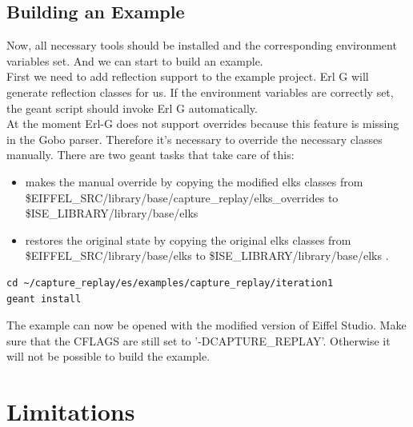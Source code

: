 \subsection{Building an Example}
Now, all necessary tools should be installed and the corresponding environment variables set. And we can start to build an example.\\
First we need to add reflection support to the example project. Erl G will generate reflection classes for us. If the environment variables are correctly set, the geant script should invoke Erl G automatically. \\
At the moment Erl-G does not support overrides because this feature is missing in the Gobo parser. Therefore it's necessary to override the necessary classes manually. There are two geant tasks that take care of this:

\begin{itemize}
\item {} makes the manual override by copying the modified elks classes from \$EIFFEL\_SRC/library/base/capture\_replay/elks\_overrides to \$ISE\_LIBRARY/library/base/elks \\
\item {} restores the original state by copying the original elks classes from \$EIFFEL\_SRC/library/base/elks to \$ISE\_LIBRARY/library/base/elks .
\end{itemize}

\begin{lstlisting}
cd ~/capture_replay/es/examples/capture_replay/iteration1
geant install
\end{lstlisting}

The example can now be opened with the modified version of Eiffel Studio. Make sure that the CFLAGS are still set to '-DCAPTURE\_REPLAY'. Otherwise it will not be possible to build the example.



\section {Limitations}
